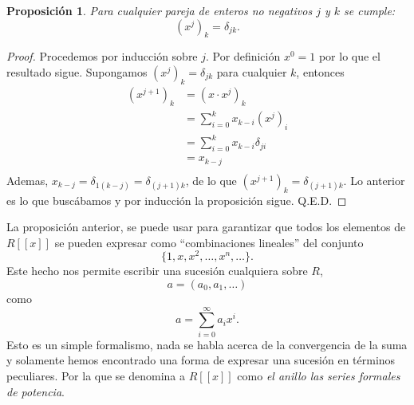 \documentclass[letter,10pt,notitlepage]{amsart}
\newtheorem{proposition}{Proposición}
\theoremstyle{definition}
\theoremstyle{remark}
\begin{document}
\begin{proposition}
  Para cualquier pareja de enteros no negativos
  \( j\) y \( k\) se cumple:
  \[ (x^j)_k = \delta_{jk}.\]
\end{proposition}
\begin{proof}
  Procedemos por inducción sobre \( j\). Por definición
  \( x^0 = 1\) por lo que el resultado sigue. Supongamos
  \( (x^j)_k = \delta_{jk}\) para cualquier \( k\), entonces
  \begin{align*}
    (x^{j+1})_k &= (x \cdot x^{j})_k \\
    &= \sum_{i=0}^{k} x_{k-i}(x^{j})_{i} \\
    &= \sum_{i=0}^{k} x_{k-i}\delta_{ji} \\
    &= x_{k-j} \\
  \end{align*}
  Ademas,  \( x_{k-j} = \delta_{1(k-j)} = \delta_{(j+1)k}\),
  de lo que \( (x^{j+1})_k = \delta_{(j+1)k}\). Lo anterior
  es lo que buscábamos y por inducción la proposición sigue. Q.E.D.
\end{proof}

La proposición anterior, se puede usar para garantizar que
todos los elementos de \( R\left[ [x] \right]\)
se pueden expresar como ``combinaciones lineales''
del conjunto 
\[  \{1,x,x^2,\dots,x^n,\dots\}.\] 
Este hecho nos permite escribir una sucesión cualquiera
sobre \( R\),
\[ a = (a_0, a_1, \ldots)\]  como
\[ a = \sum_{i=0}^{\infty}a_ix^i.\]
Esto es un simple formalismo, nada se habla acerca 
de la convergencia de la suma y solamente hemos encontrado una
forma de expresar una sucesión en términos peculiares. 
Por la que se denomina a \( R\left[ [x] \right]\) como 
\emph{el anillo las series formales de potencia}.
\end{document}
